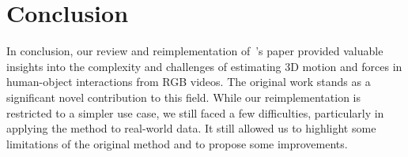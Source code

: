 \section{Conclusion}
\label{sec:conclusion}

In conclusion, our review and reimplementation of~\citet{li2019estimating}'s paper provided valuable insights into the complexity 
and challenges of estimating 3D motion and forces in human-object interactions from RGB videos. 
The original work stands as a significant novel contribution to this field. While our reimplementation is restricted to a simpler use case,
we still faced a few difficulties, particularly in applying the method to real-world data.
It still allowed us to highlight some limitations of the original method and to propose some improvements.

